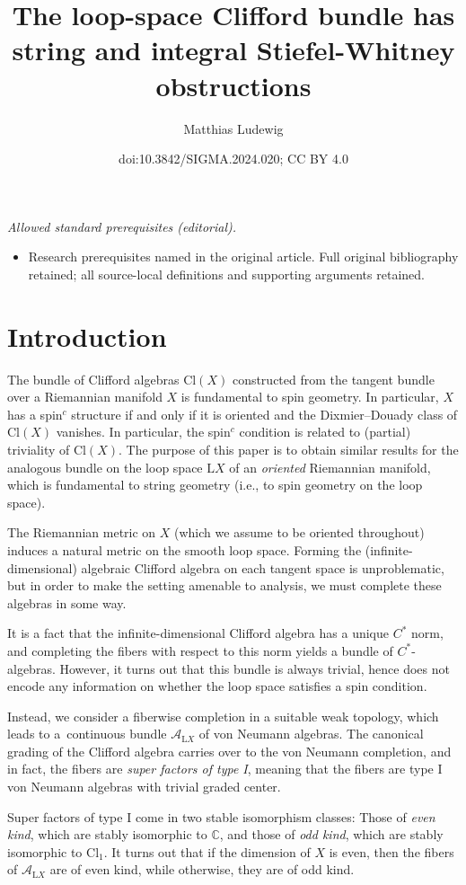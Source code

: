 \documentclass[10pt,a4paper]{amsart}
\title{The loop-space Clifford bundle has string and integral Stiefel-Whitney obstructions}
\author{Matthias Ludewig}
\date{doi:10.3842/SIGMA.2024.020; CC BY 4.0}
\numberwithin{equation}{section}
\newcommand{\C}{\mathbb{C}}
\newcommand{\Cl}{\mathrm{Cl}}
\renewcommand{\L}{\mathrm{L}}
\begin{document}
\maketitle
\noindent\textit{Allowed standard prerequisites (editorial).}\begin{itemize}
\item Research prerequisites named in the original article. Full original bibliography retained; all source-local definitions and supporting arguments retained.
\end{itemize}\medskip
\section{Introduction}

The bundle of Clifford algebras $\Cl(X)$ constructed from the tangent bundle over a Riemannian manifold $X$ is fundamental to spin geometry.
In particular, $X$ has a spin$^c$ structure if and only if it is oriented and the Dixmier--Douady class of $\Cl(X)$ vanishes.
In particular, the spin$^c$ condition is related to (partial) triviality of $\Cl(X)$.
The purpose of this paper is to obtain similar results for the analogous bundle on the loop space $\L X$ of an \emph{oriented} Riemannian manifold, which is fundamental to string geometry (i.e., to spin geometry on the loop space).

The Riemannian metric on $X$ (which we assume to be oriented throughout) induces a natural metric on the smooth loop space.
Forming the (infinite-dimensional) algebraic Clifford algebra on each tangent space is unproblematic, but in order to make the setting amenable to analysis, we must complete these algebras in some way.

It is a fact that the infinite-dimensional Clifford algebra has a unique $C^*$ norm, and completing the fibers with respect to this norm yields a bundle of $C^*$-algebras.
However, it turns out that this bundle is always trivial, hence does not encode any information on whether the loop space satisfies a spin condition.

Instead, we consider a fiberwise completion in a suitable weak topology, which leads to a~continuous bundle $\mathcal{A}_{\L X}$ of von Neumann algebras.
The canonical grading of the Clifford algebra carries over to the von Neumann completion, and in fact, the fibers are \emph{super factors of type I}, meaning that the fibers are type I von Neumann algebras with trivial graded center.

Super factors of type I come in two stable isomorphism classes:
Those of \emph{even kind}, which are stably isomorphic to $\C$, and those of \emph{odd kind}, which are stably isomorphic to $\Cl_1$.
It turns out that if the dimension of $X$ is even, then the fibers of $\mathcal{A}_{\L X}$ are of even kind, while otherwise, they are of odd kind.
\end{document}
